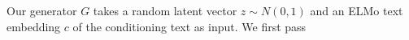 Our generator $G$ takes a random latent vector $z \sim N(0, 1)$ and an ELMo text embedding $c$ of the conditioning text as input. We first pass 